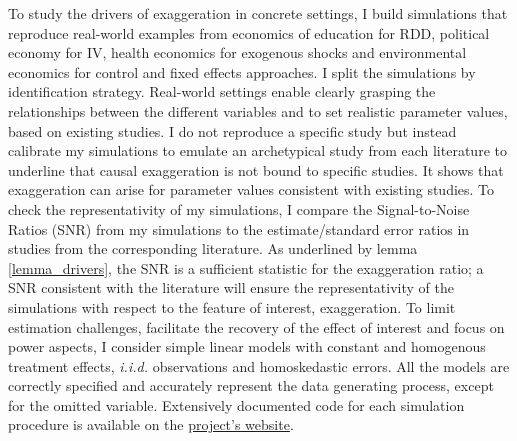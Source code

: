 \documentclass[usletter, 12pt]{article}
\begin{document}
    		To study the drivers of exaggeration in concrete settings, I build simulations that reproduce real-world examples from economics of education for RDD, %
		political economy for IV, health economics for exogenous shocks and environmental economics for control and fixed effects approaches. I split the simulations by identification strategy. %
		 Real-world settings enable clearly grasping the relationships between the different variables and to set realistic parameter values, based on existing studies. I do not reproduce a specific study but instead calibrate my simulations to emulate an archetypical study from each literature to underline that causal exaggeration is not bound to specific studies. It shows that exaggeration can arise for parameter values consistent with existing studies. To check the representativity of my simulations, I compare the Signal-to-Noise Ratios (SNR) from my simulations to the estimate/standard error ratios in studies from the corresponding literature. As underlined by lemma \ref{lemma_drivers}, the SNR is a sufficient statistic for the exaggeration ratio; a SNR consistent with the literature will ensure the representativity of the simulations with respect to the feature of interest, exaggeration. 
		 To limit estimation challenges, facilitate the recovery of the effect of interest and focus on power aspects, I consider simple linear models with constant and homogenous treatment effects, \textit{i.i.d.} observations and homoskedastic errors. All the models are correctly specified and accurately represent the data generating process, except for the omitted variable. 
		Extensively documented code for each simulation procedure is available on the \href{https://vincentbagilet.github.io/causal_exaggeration/}{project's website}.
		
\end{document}
